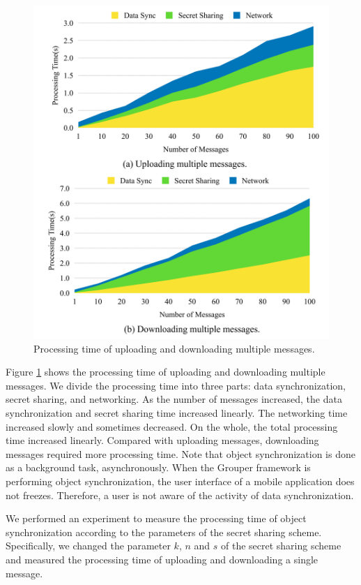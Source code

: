 \documentclass[a4paper,11pt]{report}
\begin{document}
\begin{figure}[t]
	\centering
	\includegraphics[scale=0.17]{multiple_messages}
	\caption{Processing time of uploading and downloading multiple messages.}
	\label{fig:processing_time_multiple_message}
\end{figure}

Figure \ref{fig:processing_time_multiple_message} shows the processing time of uploading and downloading multiple messages.
We divide the processing time into three parts: data synchronization, secret sharing, and networking.
As the number of messages increased, the data synchronization and secret sharing time increased linearly. 
The networking time increased slowly and sometimes decreased.
On the whole, the total processing time increased linearly.
Compared with uploading messages, downloading messages required more processing time.
Note that object synchronization is done as a background task, asynchronously.
When the Grouper framework is performing object synchronization, the user interface of a mobile application does not freezes.
Therefore, a user is not aware of the activity of data synchronization.

We performed an experiment to measure the processing time of object synchronization according to the parameters of the secret sharing scheme.
Specifically, we changed the parameter $k$, $n$ and $s$ of the secret sharing scheme and measured the processing time of uploading and downloading a single message.
\end{document}
